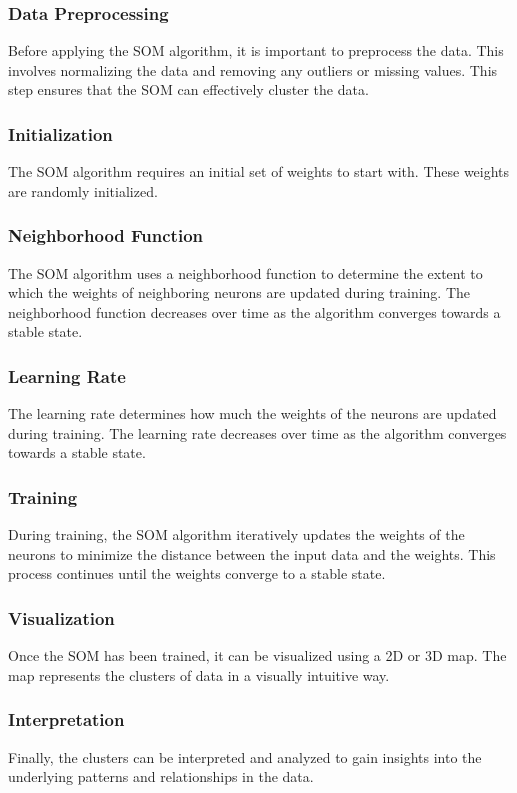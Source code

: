 \documentclass{article}
\begin{document}
\subsubsection{Data Preprocessing} 
Before applying the SOM algorithm, it is important to preprocess the data. This involves normalizing the data and removing any outliers or missing values. This step ensures that the SOM can effectively cluster the data.

\subsubsection{Initialization}
The SOM algorithm requires an initial set of weights to start with. These weights are randomly initialized.

\subsubsection{Neighborhood Function}
The SOM algorithm uses a neighborhood function to determine the extent to which the weights of neighboring neurons are updated during training. The neighborhood function decreases over time as the algorithm converges towards a stable state.

\subsubsection{Learning Rate}
The learning rate determines how much the weights of the neurons are updated during training. The learning rate decreases over time as the algorithm converges towards a stable state.

\subsubsection{Training}
During training, the SOM algorithm iteratively updates the weights of the neurons to minimize the distance between the input data and the weights. This process continues until the weights converge to a stable state.

\subsubsection{Visualization}
Once the SOM has been trained, it can be visualized using a 2D or 3D map. The map represents the clusters of data in a visually intuitive way.

\subsubsection{Interpretation}
Finally, the clusters can be interpreted and analyzed to gain insights into the underlying patterns and relationships in the data.
\end{document}
